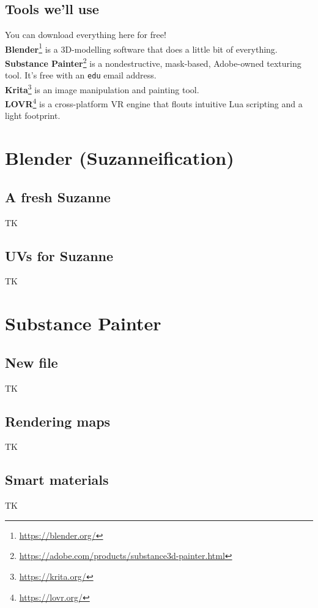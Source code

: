 \documentclass[12pt, letterpaper]{article}
\begin{document}
\subsection{Tools we'll use}
You can download everything here for free!\\
\textbf{Blender}\footnote{\url{https://blender.org/}} is a 3D-modelling software that does a little bit of everything.\\
\textbf{Substance Painter}\footnote{\url{https://adobe.com/products/substance3d-painter.html}} is a nondestructive, mask-based, Adobe-owned texturing tool. It's free with an \verb|edu| email address.\\
\textbf{Krita}\footnote{\url{https://krita.org/}} is an image manipulation and painting tool.\\
\textbf{LOVR}\footnote{\url{https://lovr.org/}} is a cross-platform VR engine that flouts intuitive Lua scripting and a light footprint.

\section{Blender (Suzanneification)}

\subsection{A fresh Suzanne}
TK

\subsection{UVs for Suzanne}
TK

\section{Substance Painter}

\subsection{New file}
TK

\subsection{Rendering maps}
TK

\subsection{Smart materials}
TK
\end{document}
